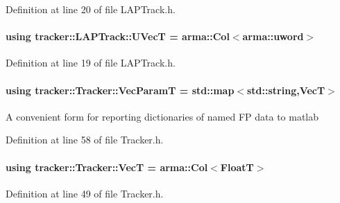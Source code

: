 Definition at line 20 of file L\+A\+P\+Track.\+h.

\paragraph[{\texorpdfstring{U\+VecT}{UVecT}}]{\setlength{\rightskip}{0pt plus 5cm}using {\bf tracker\+::\+L\+A\+P\+Track\+::\+U\+VecT} =  arma\+::\+Col$<$arma\+::uword$>$}\hypertarget{classtracker_1_1LAPTrack_aa2a2232f3db006d28422e54b9f236945}{}\label{classtracker_1_1LAPTrack_aa2a2232f3db006d28422e54b9f236945}


Definition at line 19 of file L\+A\+P\+Track.\+h.

\paragraph[{\texorpdfstring{Vec\+ParamT}{VecParamT}}]{\setlength{\rightskip}{0pt plus 5cm}using {\bf tracker\+::\+Tracker\+::\+Vec\+ParamT} =  std\+::map$<$std\+::string,{\bf VecT}$>$\hspace{0.3cm}{\ttfamily [inherited]}}\hypertarget{classtracker_1_1Tracker_a1a79f7073d8e1a032369dcc8105604ce}{}\label{classtracker_1_1Tracker_a1a79f7073d8e1a032369dcc8105604ce}
A convenient form for reporting dictionaries of named FP data to matlab 

Definition at line 58 of file Tracker.\+h.

\paragraph[{\texorpdfstring{VecT}{VecT}}]{\setlength{\rightskip}{0pt plus 5cm}using {\bf tracker\+::\+Tracker\+::\+VecT} =  arma\+::\+Col$<${\bf FloatT}$>$\hspace{0.3cm}{\ttfamily [inherited]}}\hypertarget{classtracker_1_1Tracker_a9905fa9b81b252716e651d87d7d57aff}{}\label{classtracker_1_1Tracker_a9905fa9b81b252716e651d87d7d57aff}


Definition at line 49 of file Tracker.\+h.



